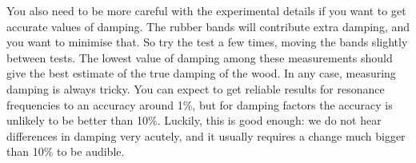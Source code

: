   You also need to be more careful with the experimental details if you want to 
  get accurate values of damping. The rubber bands will contribute extra 
  damping, and you want to minimise that. So try the test a few times, moving 
  the bands slightly between tests. The lowest value of damping among these 
  measurements should give the best estimate of the true damping of the wood. 
  In any case, measuring damping is always tricky. You can expect to get 
  reliable results for resonance frequencies to an accuracy around 1\%, but for 
  damping factors the accuracy is unlikely to be better than 10\%. Luckily, 
  this is good enough: we do not hear differences in damping very acutely, and 
  it usually requires a change much bigger than 10\% to be audible. 